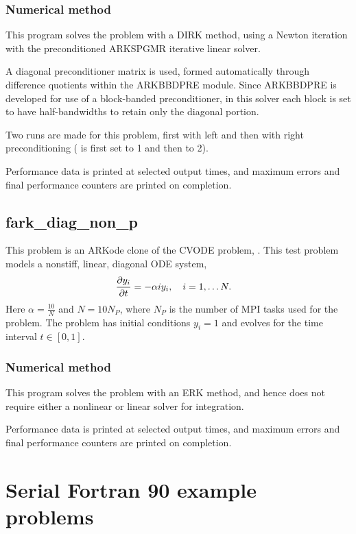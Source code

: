 \documentclass[letterpaper,10pt,english]{sphinxmanual}
\begin{document}
\subsection{Numerical method}
\label{f77_parallel:numerical-method}
This program solves the problem with a DIRK method, using a Newton
iteration with the preconditioned ARKSPGMR iterative linear solver.

A diagonal preconditioner matrix is used, formed automatically through
difference quotients within the ARKBBDPRE module.  Since ARKBBDPRE is
developed for use of a block-banded preconditioner, in this solver
each block is set to have half-bandwidths  to
retain only the diagonal portion.

Two runs are made for this problem, first with left and then with
right preconditioning ( is first set to 1 and then to 2).

Performance data is printed at selected output times, and maximum
errors and final performance counters are printed on completion.


\section{fark\_diag\_non\_p}
\label{f77_parallel:id2}\label{f77_parallel:fark-diag-non-p}
This problem is an ARKode clone of the CVODE problem,
.  This test problem models a nonstiff, linear,
diagonal ODE system,
\begin{gather}
\begin{split}\frac{\partial y_i}{\partial t} &= -\alpha i y_i, \quad i=1,\ldots N.\end{split}\notag
\end{gather}
Here \(\alpha=\frac{10}{N}\) and \(N=10 N_P\), where \(N_P\) is the
number of MPI tasks used for the problem.  The problem has initial
conditions \(y_i=1\) and evolves for the time interval \(t\in [0,1]\).


\subsection{Numerical method}
\label{f77_parallel:id3}
This program solves the problem with an ERK method, and hence does not
require either a nonlinear or linear solver for integration.

Performance data is printed at selected output times, and maximum
errors and final performance counters are printed on completion.


\chapter{Serial Fortran 90 example problems}
\label{f90_serial:serial-f90}\label{f90_serial:serial-fortran-90-example-problems}\label{f90_serial::doc}
\end{document}
